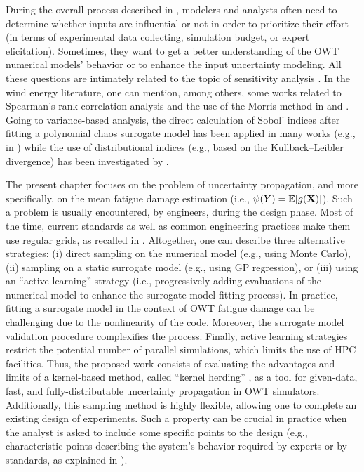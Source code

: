 During the overall process described in , modelers and analysts often need to determine whether inputs are influential or not in order to prioritize their effort (in terms of experimental data collecting, simulation budget, or expert elicitation). 
Sometimes, they want to get a better understanding of the OWT numerical models' behavior or to enhance the input uncertainty modeling. 
All these questions are intimately related to the topic of sensitivity analysis \citep{saltelli_2008,daveiga_iooss_2021}.  
In the wind energy literature, one can mention, among others, some works related to Spearman's rank correlation analysis and the use of the Morris method in \cite{verlade_kramhoft_2019} and \cite{petrovska_2022}. 
Going to variance-based analysis, the direct calculation of Sobol' indices after fitting a polynomial chaos surrogate model has been applied in many works (e.g., in \citealp{murcia_dimitrov_2018}) while the use of distributional indices (e.g., based on the Kullback–Leibler divergence) has been investigated by \citet{teixeira_2019}. 
 
The present chapter focuses on the problem of uncertainty propagation, and more specifically, on the mean fatigue damage estimation (i.e., $\psi(Y) = \mathbb{E}[g({\bf X})]$). 
Such a problem is usually encountered, by engineers, during the design phase. 
Most of the time, current standards as well as common engineering practices make them use regular grids, as recalled in \citep{huchet_2018}. 
Altogether, one can describe three alternative strategies: (i) direct sampling on the numerical model (e.g., using Monte Carlo), (ii) sampling on a static surrogate model (e.g., using GP regression), or (iii) using an ``active learning'' strategy (i.e., progressively adding evaluations of the numerical model to enhance the surrogate model fitting process). 
In practice, fitting a surrogate model in the context of OWT fatigue damage can be challenging due to the nonlinearity of the code. 
Moreover, the surrogate model validation procedure complexifies the process. 
Finally, active learning strategies restrict the potential number of parallel simulations, which limits the use of HPC facilities. 
Thus, the proposed work consists of evaluating the advantages and limits of a kernel-based method, called  ``kernel herding'' \citep{chen_welling_2010}, as a tool for given-data, fast, and fully-distributable uncertainty propagation in OWT simulators. 
Additionally, this sampling method is highly flexible, allowing one to complete an existing design of experiments. 
Such a property can be crucial in practice when the analyst is asked to include some specific points to the design (e.g., characteristic points describing the system's behavior required by experts or by standards, as explained in \citealp{huchet_2018}). 

